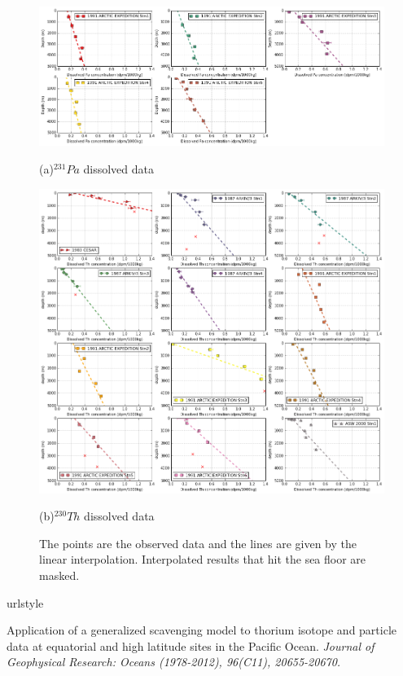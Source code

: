 \documentclass[paper=a4, fontsize=11pt]{scrartcl} %
\numberwithin{equation}{section} %
\numberwithin{figure}{section} %
\numberwithin{table}{section} %
\begin{document}
\begin{figure}[!h]
\centering
  \includegraphics[width=30pc]{Figures/Diss_Pa_all.pdf}
  \caption*{(a)$^{231}Pa$ dissolved data}
\centering  
  \includegraphics[width=30pc]{Figures/Diss_Th_all.pdf}
  \caption*{(b)$^{230}Th$ dissolved data}
\caption{The points are the observed data and the lines are given by the linear interpolation. Interpolated results that hit the sea floor are masked.}
 \label{fig:all_hori}
\end{figure}

\begin{thebibliography}{}

\providecommand{\natexlab}[1]{#1}
\expandafter\ifx\csname urlstyle\endcsname\relax
  \providecommand{\doi}[1]{doi:\discretionary{}{}{}#1}\else
  \providecommand{\doi}{doi:\discretionary{}{}{}\begingroup
  \urlstyle{rm}\Url}\fi

Application of a generalized scavenging model to thorium isotope and particle data at equatorial and high latitude sites in the Pacific Ocean. \textit{Journal of Geophysical Research: Oceans (1978-2012), 96(C11), 20655-20670.}
\end{thebibliography}
\end{document}
